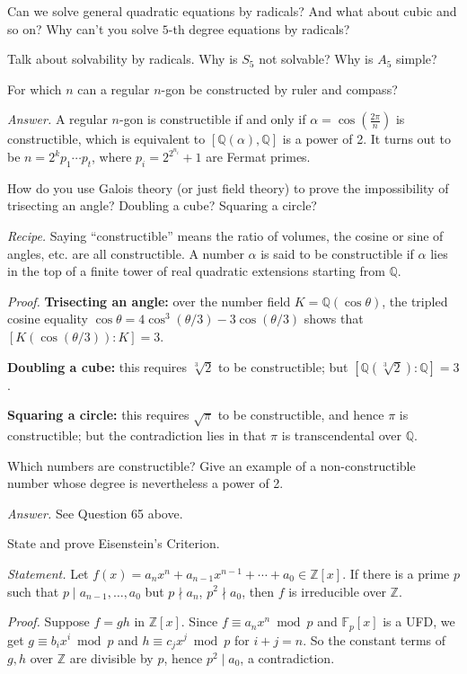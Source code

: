 \documentclass{mathproblems}
\newcommand\F{\mathbb{F}}
\newcommand\Q{\mathbb{Q}}
\newcommand\Z{\mathbb{Z}}
\begin{document}
\begin{questions}
\miquestion
{\color{blue} Can we solve general quadratic equations by radicals? And what about cubic and so on? Why can't you solve $5$-th degree equations by radicals?}

\miquestion
{\color{blue} Talk about solvability by radicals. Why is $S_{5}$ not solvable? Why is $A_{5}$ simple?}

\miquestion
{\color{blue} For which $n$ can a regular $n$-gon be constructed by ruler and compass?}

\textit{Answer.} A regular $n$-gon is constructible if and only if $\alpha = \cos(\frac{2\pi}{n})$ is constructible, which is equivalent to $[\Q(\alpha),\Q]$ is a power of 2. It turns out to be $n=2^k p_1\cdots p_t$, where $p_i=2^{2^{n_i}}+1$ are Fermat primes.

\miquestion
{\color{blue} How do you use Galois theory (or just field theory) to prove the impossibility of trisecting an angle? Doubling a cube? Squaring a circle?}

{\color{violet}
\textit{Recipe.} Saying ``constructible'' means the ratio of volumes, the cosine or sine of angles, etc. are all constructible. A number $\alpha$ is said to be constructible if $\alpha$ lies in the top of a finite tower of real quadratic extensions starting from $\Q$.
}

\textit{Proof.} \textbf{Trisecting an angle:} over the number field $K=\Q(\cos\theta)$, the tripled cosine equality $\cos\theta=4\cos^3(\theta/3)-3\cos(\theta/3)$ shows that $[K(\cos(\theta/3)):K]=3$.

\textbf{Doubling a cube:} this requires $\sqrt[3]{2}$ to be constructible; but $[\Q(\sqrt[3]{2}):\Q]=3$.

\textbf{Squaring a circle:} this requires $\sqrt{\pi}$ to be constructible, and hence $\pi$ is constructible; but the contradiction lies in that $\pi$ is transcendental over $\Q$.

\miquestion
{\color{blue} Which numbers are constructible? Give an example of a non-constructible number whose degree is nevertheless a power of 2.}

\textit{Answer.} See Question 65 above.

\miquestion
{\color{blue} State and prove Eisenstein's Criterion.}

\textit{Statement.}
Let $f(x)=a_n x^n+a_{n-1}x^{n-1}+\cdots+a_0\in \Z[x]$. If there is a prime $p$ such that $p\mid a_{n-1},\ldots,a_0$ but $p \nmid a_n$, $p^2\nmid a_0$, then $f$ is irreducible over $\Z$.

\textit{Proof.}
Suppose $f=g h$ in $\Z[x]$. Since $f\equiv a_n x^n\bmod p$ and $\F_p[x]$ is a UFD, we get $g\equiv b_i x^i\bmod p$ and $h\equiv c_j x^j\bmod p$ for $i+j=n$. So the constant terms of $g,h$ over $\Z$ are divisible by $p$, hence $p^2\mid a_0$, a contradiction.


\end{questions}
\end{document}
